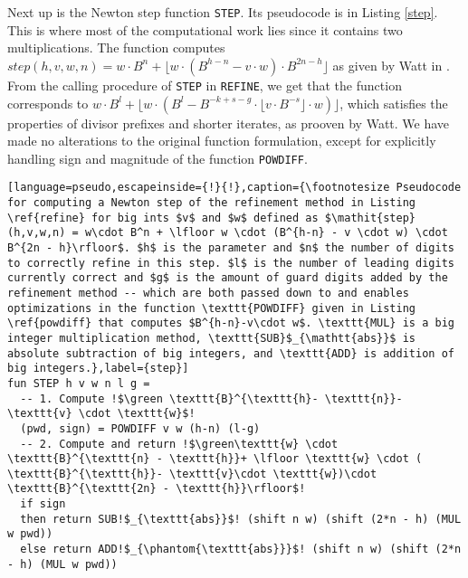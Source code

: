 Next up is the Newton step function \texttt{STEP}. Its pseudocode is in Listing
\ref{step}. This is where most of the computational work lies since it contains
two multiplications. The function computes
$\mathit{step}(h,v,w,n) = w\cdot B^n + \lfloor w \cdot (B^{h-n} - v \cdot w) \cdot B^{2n - h}\rfloor$ as
given by Watt in \cite{watt2023efficient}. From the calling procedure of
\texttt{STEP} in \texttt{REFINE}, we get that the function corresponds to
$w\cdot B^l + \lfloor w \cdot (B^{l} - B^{-k+s-g} \cdot \lfloor v\cdot B^{-s} \rfloor \cdot w)\rfloor$, which satisfies the
properties of divisor prefixes and shorter iterates, as prooven by Watt. We have
made no alterations to the original function formulation, except for explicitly
handling sign and magnitude of the function \texttt{POWDIFF}.

\begin{lstlisting}[language=pseudo,escapeinside={!}{!},caption={\footnotesize Pseudocode for computing a Newton step of the refinement method in Listing \ref{refine} for big ints $v$ and $w$ defined as $\mathit{step}(h,v,w,n) = w\cdot B^n + \lfloor w \cdot (B^{h-n} - v \cdot w) \cdot B^{2n - h}\rfloor$. $h$ is the parameter and $n$ the number of digits to correctly refine in this step. $l$ is the number of leading digits currently correct and $g$ is the amount of guard digits added by the refinement method -- which are both passed down to and enables optimizations in the function \texttt{POWDIFF} given in Listing \ref{powdiff} that computes $B^{h-n}-v\cdot w$. \texttt{MUL} is a big integer multiplication method, \texttt{SUB}$_{\mathtt{abs}}$ is absolute subtraction of big integers, and \texttt{ADD} is addition of big integers.},label={step}]
fun STEP h v w n l g =
  -- 1. Compute !$\green \texttt{B}^{\texttt{h}- \texttt{n}}- \texttt{v} \cdot \texttt{w}$!
  (pwd, sign) = POWDIFF v w (h-n) (l-g)
  -- 2. Compute and return !$\green\texttt{w} \cdot \texttt{B}^{\texttt{n} - \texttt{h}}+ \lfloor \texttt{w} \cdot ( \texttt{B}^{\texttt{h}}- \texttt{v}\cdot \texttt{w})\cdot \texttt{B}^{\texttt{2n} - \texttt{h}}\rfloor$!
  if sign
  then return SUB!$_{\texttt{abs}}$! (shift n w) (shift (2*n - h) (MUL w pwd))
  else return ADD!$_{\phantom{\texttt{abs}}}$! (shift n w) (shift (2*n - h) (MUL w pwd))
\end{lstlisting}

